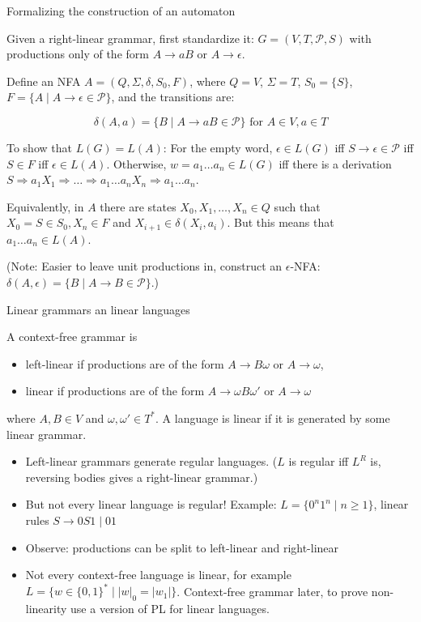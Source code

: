 \documentclass[handout]{beamer}
\begin{document}
\begin{frame}{Formalizing the construction of an automaton}

	Given a right-linear grammar, first standardize it: $G=(V,T,\mathcal P,S)$ with productions only of the form $A\rightarrow aB$ or $A\rightarrow \epsilon$.
	
	Define an NFA $A=(Q,\Sigma,\delta,S_0,F)$, where $Q=V$, $\Sigma=T$, $S_0=\{S\}$, $F=\{A\mid A\rightarrow\epsilon\in\mathcal P\}$, and the transitions are:
	
	\vspace{-15pt}
	$$
	\delta(A,a)=\{B\mid A\rightarrow aB\in\mathcal P\}\text{ for }A\in V,a\in T
	$$
	\vspace{-21pt}
	
	To show that $L(G)=L(A)$: For the empty word, $\epsilon\in L(G)$ iff $S\rightarrow \epsilon\in\mathcal P$ iff $S \in F$ iff $\epsilon \in L(A)$. Otherwise, $w=a_1\dots a_n\in L(G)$ iff there is a derivation $S\Rightarrow a_1 X_1 \Rightarrow \dots \Rightarrow a_1\dots a_n X_n\Rightarrow a_1\dots a_n$.

	Equivalently, in $A$ there are states $X_0,X_1,\dots, X_n\in Q$ such that $X_0=S\in S_0, X_n\in F$ and $X_{i+1}\in \delta(X_i, a_i)$. But this means that $a_1\dots a_n\in L(A)$.\hfill\qedsymbol

	\vspace{-3pt}
	(Note: Easier to leave unit productions in, construct an $\epsilon$-NFA: $\delta(A,\epsilon)=\{B\mid A\rightarrow B\in\mathcal P\}$.)

\end{frame}


\begin{frame}{Linear grammars an linear languages}

	A context-free grammar is
	\begin{itemize}
		\item \alert{left-linear} if productions are of the form $A\rightarrow B\omega$ or $A\rightarrow\omega$,
		\item \alert{linear} if productions are of the form $A\rightarrow \omega B\omega'$ or $A\rightarrow\omega$
	\end{itemize}
	where $A,B\in V$ and $\omega,\omega'\in T^*$. A language is \alert{linear} if it is generated by some linear grammar.

	\begin{itemize}
		\item Left-linear grammars generate regular languages. ($L$ is regular iff $L^R$ is, reversing bodies gives a right-linear grammar.)
		\item But not every linear language is regular! Example: $L=\{0^n1^n\mid n\geq 1\}$, linear rules $S\rightarrow 0S1\mid 01$
		\item Observe: productions can be split to left-linear and right-linear
		\item Not every context-free language is linear, for example $L=\{w\in\{0,1\}^*\mid |w|_0=|w_1|\}$. Context-free grammar later, to prove non-linearity use a version of PL for linear languages.
	\end{itemize}

\end{frame}
\end{document}
